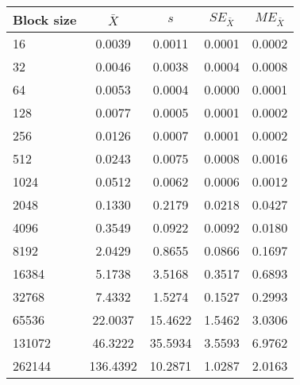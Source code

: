 \begin{tabular}{lcccc}\toprule
{\small Block size} & $\bar{X}$ & $s$ & $SE_{\bar{X}}$ & $ME_{\bar{X}}$ \\\midrule
16 & 0.0039 & 0.0011 & 0.0001 & 0.0002\\
32 & 0.0046 & 0.0038 & 0.0004 & 0.0008\\
64 & 0.0053 & 0.0004 & 0.0000 & 0.0001\\
128 & 0.0077 & 0.0005 & 0.0001 & 0.0002\\
256 & 0.0126 & 0.0007 & 0.0001 & 0.0002\\
512 & 0.0243 & 0.0075 & 0.0008 & 0.0016\\
1024 & 0.0512 & 0.0062 & 0.0006 & 0.0012\\
2048 & 0.1330 & 0.2179 & 0.0218 & 0.0427\\
4096 & 0.3549 & 0.0922 & 0.0092 & 0.0180\\
8192 & 2.0429 & 0.8655 & 0.0866 & 0.1697\\
16384 & 5.1738 & 3.5168 & 0.3517 & 0.6893\\
32768 & 7.4332 & 1.5274 & 0.1527 & 0.2993\\
65536 & 22.0037 & 15.4622 & 1.5462 & 3.0306\\
131072 & 46.3222 & 35.5934 & 3.5593 & 6.9762\\
262144 & 136.4392 & 10.2871 & 1.0287 & 2.0163\\
\bottomrule
\end{tabular}
